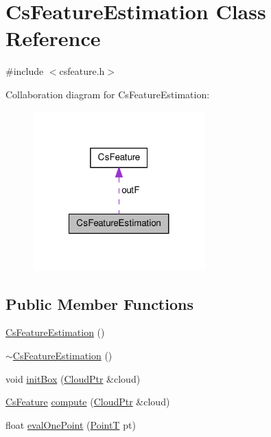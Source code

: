 \hypertarget{class_cs_feature_estimation}{\section{\-Cs\-Feature\-Estimation \-Class \-Reference}
\label{class_cs_feature_estimation}
}


{\ttfamily \#include $<$csfeature.\-h$>$}



\-Collaboration diagram for \-Cs\-Feature\-Estimation\-:
\nopagebreak
\begin{figure}[H]
\begin{center}
\leavevmode
\includegraphics[width=188pt]{class_cs_feature_estimation__coll__graph}
\end{center}
\end{figure}
\subsection*{\-Public \-Member \-Functions}
\begin{DoxyCompactItemize}
\item 
\hyperlink{class_cs_feature_estimation_aa7f0224770d27abed5c151282b0335d5}{\-Cs\-Feature\-Estimation} ()
\item 
\hyperlink{class_cs_feature_estimation_afc2f51c2f489b8290900643e011f06df}{$\sim$\-Cs\-Feature\-Estimation} ()
\item 
void \hyperlink{class_cs_feature_estimation_ad32a35aa8166ab63e7fdececc2ec313a}{init\-Box} (\hyperlink{common_8h_a36884aa4a3c181fa4c284d79329ad166}{\-Cloud\-Ptr} \&cloud)
\item 
\hyperlink{class_cs_feature}{\-Cs\-Feature} \hyperlink{class_cs_feature_estimation_ae3c58e0d970953a13cbd2b250193a297}{compute} (\hyperlink{common_8h_a36884aa4a3c181fa4c284d79329ad166}{\-Cloud\-Ptr} \&cloud)
\item 
float \hyperlink{class_cs_feature_estimation_a87416044424af9e1282e68ec43e4c2d6}{eval\-One\-Point} (\hyperlink{common_8h_af63aa02ad22799ec1b392e97942874b5}{\-Point\-T} pt)
\end{DoxyCompactItemize}
